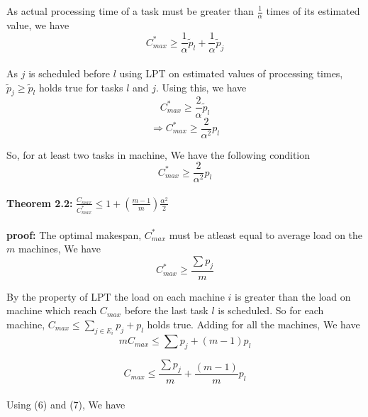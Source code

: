 \documentclass[10pt, conference, compsocconf]{IEEEtran}
\begin{document}
As actual processing time of a task must be greater than $\frac{1}{\alpha}$ times of its estimated value, we have
\begin{equation}\nonumber 
C_{max}^{*} \geq \frac{1}{\alpha}\tilde p_l +  \frac{1}{\alpha} \tilde p_j 
\end{equation}
\\
As $j$ is scheduled before $l$ using LPT on estimated values of processing times,  $\tilde p_j\geq   \tilde p_l$ holds true for tasks $l$ and $j$.  Using this, we have\\

\begin{equation}\nonumber
 C_{max}^{*} \geq \frac{2}{\alpha}\tilde p_l
 \end{equation}
\begin{equation}\nonumber 
\Rightarrow C_{max}^{*} \geq {\frac{2}{\alpha^{2}}} p_l  \end{equation}

So, for at least two tasks in machine, We have the following condition\\
\begin{equation}
C_{max}^{*} \geq {\frac{2}{\alpha^{2}}} p_l 
\end{equation}
\\
\textbf{Theorem 2.2:} $\frac{C_{max}}{C_{max}^{*}} \leq 1 + (\frac{m-1}{m})\frac{\alpha^{2}}{2}$\\
\\
\textbf{proof:} The optimal makespan, $C_{max}^{*}$ must be atleast equal to average load on the $m$ machines, We have\\
\begin{equation}
C_{max}^{*}\geq\frac{\sum p_j}{m}
\end{equation}

By the property of LPT the load on each machine $i$ is greater than the load on machine which reach $C_{max}$ before the last task $l$ is scheduled. So for each machine, $C_{max} \leq  \sum_{j \in E_i}^{}{p_j} + p_l$ holds true.  Adding for all the machines, We have\\

\begin{equation}\nonumber 
mC_{max} \leq  \sum {p_j} + (m-1)p_l
\end{equation}

\begin{equation}
C_{max} \leq  \frac{\sum {p_j}}{m} + \frac{(m-1)}{m}p_l
\end{equation}
\\
Using (6) and (7), We have\\
\end{document}

